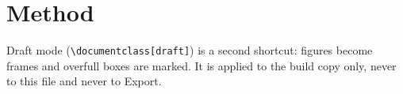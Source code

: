 \chapter{Method}\label{ch:method}
Draft mode (\texttt{\textbackslash documentclass[draft]}) is a second
shortcut: figures become frames and overfull boxes are marked. It is applied
to the build copy only, never to this file and never to Export.

\lipsum[4-6]

